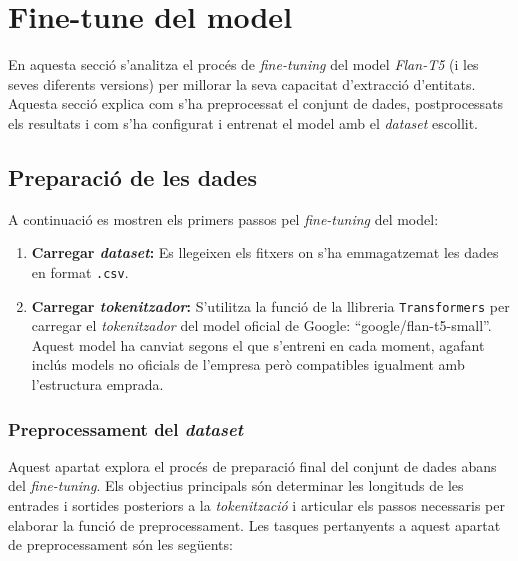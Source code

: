 \section{Fine-tune del model}
\label{sec:fine-tune}
En aquesta secció s'analitza el procés de \textit{fine-tuning} del model \textit{Flan-T5} (i les seves diferents versions) per millorar la seva capacitat d'extracció d'entitats. Aquesta secció explica com s'ha preprocessat el conjunt de dades, postprocessats els resultats i com s'ha configurat i entrenat el model amb el \textit{dataset} escollit.

\subsection{Preparació de les dades}
A continuació es mostren els primers passos pel \textit{fine-tuning} del model:

\begin{enumerate}
    \item \textbf{Carregar \textit{dataset}:} Es llegeixen els fitxers on s'ha emmagatzemat les dades en format \texttt{.csv}.
    \item \textbf{Carregar \textit{tokenitzador}:} S'utilitza la funció  de la llibreria \texttt{Transformers} per carregar el \textit{tokenitzador} del model oficial de Google: ``google/flan-t5-small''. Aquest model ha canviat segons el que s'entreni en cada moment, agafant inclús models no oficials de l'empresa però compatibles igualment amb l'estructura emprada.
\end{enumerate}


\subsubsection{Preprocessament del \textit{dataset}}
Aquest apartat explora el procés de preparació final del conjunt de dades abans del \textit{fine-tuning}. Els objectius principals són determinar les longituds de les entrades i sortides posteriors a la \textit{tokenització} i articular els passos necessaris per elaborar la funció de preprocessament. Les tasques pertanyents a aquest apartat de preprocessament són les següents:

